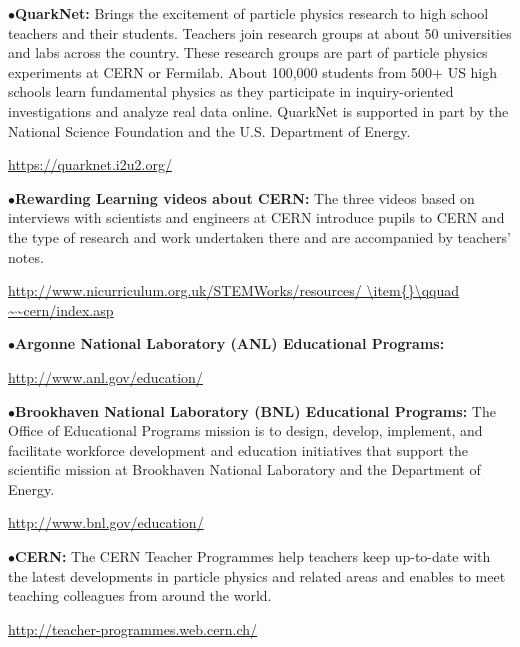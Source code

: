 \smallskip

\item{$\bullet$}{\bf QuarkNet:} 
Brings the excitement of particle physics research to high school teachers and their students. Teachers join research groups at about 50 universities and labs across the country. These research groups are part of particle physics experiments at CERN or Fermilab. About 100,000 students from 500+ US high schools learn fundamental physics as they participate in inquiry-oriented investigations and analyze real data online. QuarkNet is supported in part by the National Science Foundation and the U.S. Department of Energy.
	\item{}\qquad\url{https://quarknet.i2u2.org/}

\medskip

\item{$\bullet$}{\bf Rewarding Learning videos about CERN:}
The three videos based on interviews with scientists and engineers at CERN introduce pupils to CERN and the type of research and work undertaken there and are accompanied by teachers' notes.
	\item{}\qquad\url{http://www.nicurriculum.org.uk/STEMWorks/resources/
        \item{}\qquad ~~cern/index.asp}


\medskip
\medskip


\smallskip

\item{$\bullet$}{\bf Argonne National Laboratory (ANL) Educational Programs:}
	\item{}\qquad\url{http://www.anl.gov/education/}

\smallskip

\item{$\bullet$}{\bf Brookhaven National Laboratory (BNL) Educational Programs:}
The Office of Educational Programs mission is to design, develop, implement, and facilitate workforce development and education initiatives that support the scientific mission at Brookhaven National Laboratory and the Department of Energy.
	\item{}\qquad\url{http://www.bnl.gov/education/}

\smallskip

\item{$\bullet$}{\bf CERN:} 
The CERN Teacher Programmes help teachers keep up-to-date with the latest developments in particle physics and related areas and enables to meet teaching colleagues from around the world.
	\item{}\qquad\url{http://teacher-programmes.web.cern.ch/}

